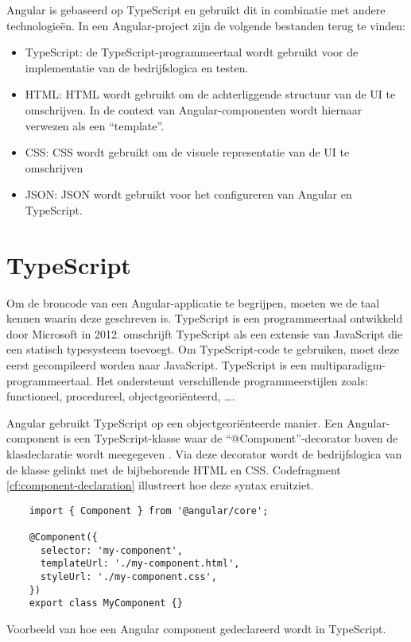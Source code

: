 Angular is gebaseerd op TypeScript en gebruikt dit in combinatie met andere technologieën.
In een Angular-project zijn de volgende bestanden terug te vinden:
\begin{itemize}
  \item TypeScript: de TypeScript-programmeertaal wordt gebruikt voor de implementatie van de bedrijfslogica en testen.
  \item HTML: HTML wordt gebruikt om de achterliggende structuur van de UI te omschrijven. 
    In de context van Angular-componenten wordt hiernaar verwezen als een ``template''.
  \item CSS: CSS wordt gebruikt om de visuele representatie van de UI te omschrijven
  \item JSON: JSON wordt gebruikt voor het configureren van Angular en TypeScript.
\end{itemize}

\section{TypeScript}
\label{ch:stand-van-zaken:typescript}

Om de broncode van een Angular-applicatie te begrijpen, moeten we de taal kennen waarin deze geschreven is.
TypeScript is een programmeertaal ontwikkeld door Microsoft in 2012.
\textcite{Bierman2014} omschrijft TypeScript als een extensie van JavaScript die een statisch typesysteem toevoegt.
Om TypeScript-code te gebruiken, moet deze eerst gecompileerd worden naar JavaScript.
TypeScript is een multiparadigm-programmeertaal. 
Het ondersteunt verschillende programmeerstijlen zoals: functioneel, procedureel, objectgeoriënteerd, \dots.

Angular gebruikt TypeScript op een objectgeoriënteerde manier.
Een Angular-component is een TypeScript-klasse waar de ``@Component''-decorator boven de klasdeclaratie wordt meegegeven \autocite{Wilken2018}.
Via deze decorator wordt de bedrijfslogica van de klasse gelinkt met de bijbehorende HTML en CSS.
Codefragment \ref{cf:component-declaration} illustreert hoe deze syntax eruitziet.

\begin{listing}
  \begin{verbatim}
    import { Component } from '@angular/core';
    
    @Component({
      selector: 'my-component',
      templateUrl: './my-component.html',
      styleUrl: './my-component.css',
    })
    export class MyComponent {}
  \end{verbatim}
  \caption[Voorbeeld Angular component]{Voorbeeld van hoe een Angular component gedeclareerd wordt in TypeScript.}
  \label{cf:component-declaration}
\end{listing}

